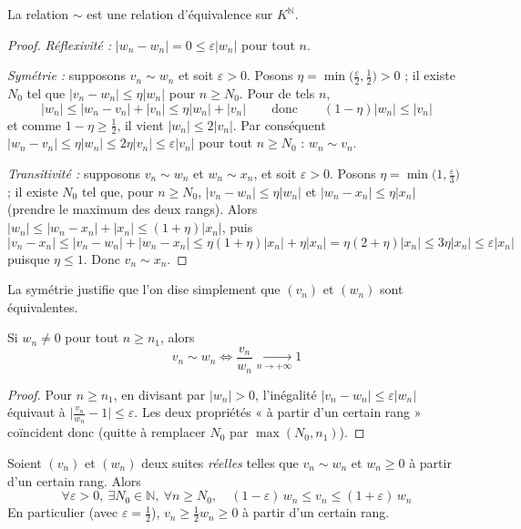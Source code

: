 \begin{prop}
\label{prop:equivalence-suites-relation}
La relation $\sim$ est une relation d'équivalence sur $K^{\mathbb{N}}$.
\end{prop}

\begin{proof}
\emph{Réflexivité :} $|w_n-w_n|=0\leq\varepsilon|w_n|$ pour tout $n$.

\emph{Symétrie :} supposons $v_n\sim w_n$ et soit $\varepsilon>0$. Posons $\eta=\min\big(\frac{\varepsilon}{2},\frac12\big)>0$ ; il existe $N_0$ tel que $|v_n-w_n|\leq\eta|w_n|$ pour $n\geq N_0$. Pour de tels $n$,
\[|w_n| \leq |w_n-v_n|+|v_n| \leq \eta|w_n|+|v_n| \qquad\text{donc}\qquad (1-\eta)|w_n|\leq|v_n|\]
et comme $1-\eta\geq\frac12$, il vient $|w_n|\leq 2|v_n|$. Par conséquent $|w_n-v_n|\leq\eta|w_n|\leq 2\eta|v_n|\leq\varepsilon|v_n|$ pour tout $n\geq N_0$ : $w_n\sim v_n$.

\emph{Transitivité :} supposons $v_n\sim w_n$ et $w_n\sim x_n$, et soit $\varepsilon>0$. Posons $\eta=\min\big(1,\frac{\varepsilon}{3}\big)$ ; il existe $N_0$ tel que, pour $n\geq N_0$, $|v_n-w_n|\leq\eta|w_n|$ et $|w_n-x_n|\leq\eta|x_n|$ (prendre le maximum des deux rangs). Alors $|w_n|\leq|w_n-x_n|+|x_n|\leq(1+\eta)|x_n|$, puis
\[|v_n-x_n| \leq |v_n-w_n|+|w_n-x_n| \leq \eta(1+\eta)|x_n|+\eta|x_n| = \eta(2+\eta)|x_n| \leq 3\eta|x_n|\leq\varepsilon|x_n|\]
puisque $\eta\leq 1$. Donc $v_n\sim x_n$.
\end{proof}

La symétrie justifie que l'on dise simplement que $(v_n)$ et $(w_n)$ sont équivalentes.

\begin{prop}
\label{prop:equivalent-quotient}
Si $w_n\neq 0$ pour tout $n\geq n_1$, alors
\[v_n\sim w_n \iff \frac{v_n}{w_n}\xrightarrow[n\to+\infty]{}1\]
\end{prop}

\begin{proof}
Pour $n\geq n_1$, en divisant par $|w_n|>0$, l'inégalité $|v_n-w_n|\leq\varepsilon|w_n|$ équivaut à $\big|\frac{v_n}{w_n}-1\big|\leq\varepsilon$. Les deux propriétés « à partir d'un certain rang » coïncident donc (quitte à remplacer $N_0$ par $\max(N_0,n_1)$).
\end{proof}

\begin{prop}[Encadrement]
\label{prop:equivalent-encadrement}
Soient $(v_n)$ et $(w_n)$ deux suites \emph{réelles} telles que $v_n\sim w_n$ et $w_n\geq 0$ à partir d'un certain rang. Alors
\[\forall\varepsilon>0,\ \exists N_0\in\mathbb{N},\ \forall n\geq N_0,\quad (1-\varepsilon)\,w_n\leq v_n\leq(1+\varepsilon)\,w_n\]
En particulier (avec $\varepsilon=\frac12$), $v_n\geq\frac12 w_n\geq 0$ à partir d'un certain rang.
\end{prop}

